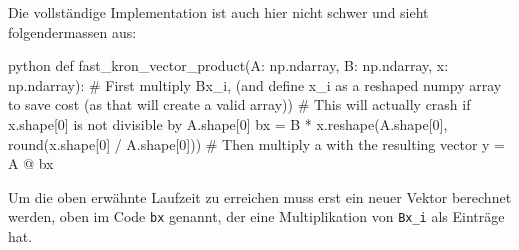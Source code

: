 Die vollständige Implementation ist auch hier nicht schwer und sieht folgendermassen aus:
\begin{code}{python}
    def fast_kron_vector_product(A: np.ndarray, B: np.ndarray, x: np.ndarray):
        # First multiply Bx_i, (and define x_i as a reshaped numpy array to save cost (as that will create a valid array))
        # This will actually crash if x.shape[0] is not divisible by A.shape[0]
        bx = B * x.reshape(A.shape[0], round(x.shape[0] / A.shape[0]))
        # Then multiply a with the resulting vector
        y = A @ bx
\end{code}

Um die oben erwähnte Laufzeit zu erreichen muss erst ein neuer Vektor berechnet werden, oben im Code \verb|bx| genannt, der eine Multiplikation von \verb|Bx_i| als Einträge hat.
